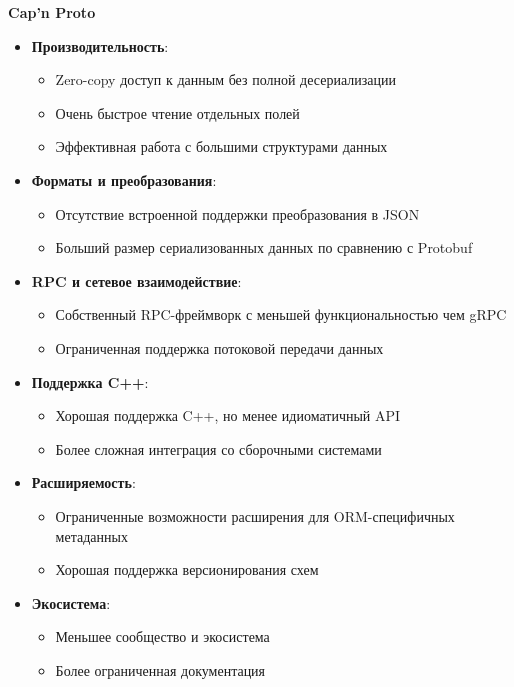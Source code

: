         \textbf{Cap'n Proto}

            \begin{itemize}
                \item \textbf{Производительность}:
                \begin{itemize}
                    \item Zero-copy доступ к данным без полной десериализации
                    \item Очень быстрое чтение отдельных полей
                    \item Эффективная работа с большими структурами данных
                \end{itemize}

                \item \textbf{Форматы и преобразования}:
                \begin{itemize}
                    \item Отсутствие встроенной поддержки преобразования в JSON
                    \item Больший размер сериализованных данных по сравнению с Protobuf
                \end{itemize}

                \item \textbf{RPC и сетевое взаимодействие}:
                \begin{itemize}
                    \item Собственный RPC-фреймворк с меньшей функциональностью чем gRPC
                    \item Ограниченная поддержка потоковой передачи данных
                \end{itemize}

                \item \textbf{Поддержка C++}:
                \begin{itemize}
                    \item Хорошая поддержка C++, но менее идиоматичный API
                    \item Более сложная интеграция со сборочными системами
                \end{itemize}

                \item \textbf{Расширяемость}:
                \begin{itemize}
                    \item Ограниченные возможности расширения для ORM-специфичных метаданных
                    \item Хорошая поддержка версионирования схем
                \end{itemize}

                \item \textbf{Экосистема}:
                \begin{itemize}
                    \item Меньшее сообщество и экосистема
                    \item Более ограниченная документация
                \end{itemize}
            \end{itemize}

